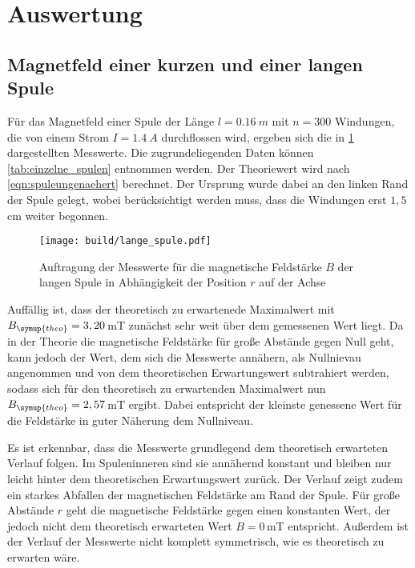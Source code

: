 \section{Auswertung}
\label{sec:Auswertung}

\subsection{Magnetfeld einer kurzen und einer langen Spule}

Für das Magnetfeld einer Spule der Länge $l=\SI{0,16}{m}$ mit $n=300$ Windungen,
die von einem Strom $I=\SI{1,4}{A}$ durchflossen wird, ergeben sich die in
\ref{fig:lange_spule} dargestellten Messwerte. Die zugrundeliegenden Daten können
\ref{tab:einzelne_spulen} entnommen werden. Der Theoriewert wird nach \ref{eqn:spuleungenaehert} berechnet.
Der Ursprung wurde dabei an den linken Rand der Spule gelegt, wobei berücksichtigt werden
muss, dass die Windungen erst $1,5$cm weiter begonnen.

\begin{figure}
  \centering
  \texttt{[image: build/lange\_spule.pdf]}
  \caption{Auftragung der Messwerte für die magnetische Feldstärke $B$ der langen Spule
  in Abhängigkeit der Position $r$ auf der Achse}
  \label{fig:lange_spule}
\end{figure}

Auffällig ist, dass der theoretisch zu erwartenede Maximalwert mit $B_{\symup{theo}}=3,20$\,mT
zunächst sehr weit über dem gemessenen Wert liegt. Da in der Theorie die magnetische
Feldstärke für große Abstände gegen Null geht, kann jedoch der Wert, dem sich die
Messwerte annähern, als Nullnievau angenommen und von dem theoretischen Erwartungswert
subtrahiert werden, sodass sich für den theoretisch zu erwartenden Maximalwert nun
$B_{\symup{theo}}=2,57$\,mT ergibt. Dabei entspricht der kleinste genessene Wert für die Feldstärke
in guter Näherung dem Nullniveau.

Es ist erkennbar, dass die Messwerte grundlegend dem theoretisch erwarteten Verlauf folgen.
Im Spuleninneren sind sie annähernd konstant und bleiben nur leicht hinter dem
theoretischen Erwartungswert zurück. Der Verlauf zeigt zudem ein starkes Abfallen
der magnetischen Feldstärke am Rand der Spule. Für große Abstände $r$ geht die magnetische
Feldstärke gegen einen konstanten Wert, der jedoch nicht dem theoretisch erwarteten
Wert $B=0$\,mT entspricht. Außerdem ist der Verlauf der Messwerte nicht komplett symmetrisch,
wie es theoretisch zu erwarten wäre.


